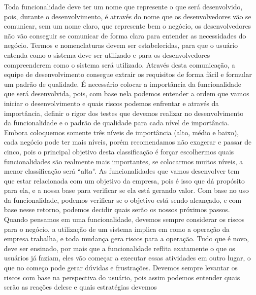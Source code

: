       Toda funcionalidade deve ter um nome que represente o que será desenvolvido,
      pois, durante o desenvolvimento, é através do nome que os desenvolvedores
      vão se comunicar, sem um nome claro, que represente bem o negócio, os
      desenvolvedores não vão conseguir se comunicar de forma clara para entender
      as necessidades do negócio. Termos e nomenclaturas devem ser estabelecidas,
      para que o usuário entenda como o sistema deve ser utilizado e para os
      desenvolvedores compreenderem como o sistema será utilizado. Através desta
      comunicação, a equipe de desenvolvimento consegue extrair os requisitos de forma
      fácil e formular um padrão de qualidade. \newline
      É necessário colocar a importância da funcionalidade que será desenvolvida, pois,
      com base nela podemos entender a ordem que vamos iniciar o desenvolvimento
      e quais riscos podemos enfrentar e através da importância, definir
      o rigor dos testes que devemos realizar no desenvolvimento da funcionalidade
      e o padrão de qualidade para cada nível de importância. Embora coloquemos
      somente três níveis de importância (alto, médio e baixo), cada negócio pode
      ter mais níveis, porém recomendamos não exagerar e passar de cinco,
      pois o principal objetivo desta classificação é forçar escolhermos quais
      funcionalidades são realmente mais importantes, se colocarmos muitos níveis,
      a menor classificação será “alta”. \newline
      As funcionalidades que vamos desenvolver tem que estar relacionada com um
      objetivo da empresa, pois é isso que dá propósito para ela, e a nossa base
      para verificar se ela está gerando valor. Com base no uso da funcionalidade,
      podemos verificar se o objetivo está sendo alcançado, e com base nesse
      retorno, podemos decidir quais serão os nossos próximos passos. \newline
      Quando pensamos em uma funcionalidade, devemos sempre considerar os riscos
      para o negócio, a utilização de um sistema implica em como a operação da
      empresa trabalha, e toda mudança gera riscos para a operação. Tudo que é
      novo, deve ser ensinado, por mais que a funcionalidade reflita exatamente o
      que os usuários já faziam, eles vão começar a executar essas atividades em
      outro lugar, o que no começo pode gerar dúvidas e frustrações. Devemos
      sempre levantar os riscos com base na perspectiva do usuário, pois assim
      podemos entender quais serão as reações delese e quais estratégias devemos
